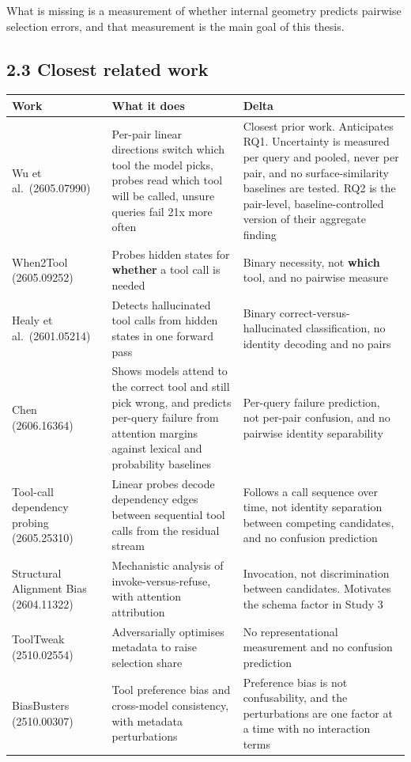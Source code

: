 \documentclass[11pt,a4paper]{article}
\begin{document}
What is missing is a measurement of whether internal geometry predicts pairwise selection errors,
and that measurement is the main goal of this thesis.

\subsection*{2.3 Closest related work}

\begin{tabular}{@{}L{3.2cm}L{5.9cm}L{6.2cm}@{}}
\toprule
\textbf{Work} & \textbf{What it does} & \textbf{Delta} \\
\midrule
Wu et al.\ (2605.07990) & Per-pair linear directions switch which tool the model picks, probes read which tool will be called, unsure queries fail 21x more often & Closest prior work. Anticipates RQ1. Uncertainty is measured per query and pooled, never per pair, and no surface-similarity baselines are tested. RQ2 is the pair-level, baseline-controlled version of their aggregate finding \\
When2Tool (2605.09252) & Probes hidden states for \textbf{whether} a tool call is needed & Binary necessity, not \textbf{which} tool, and no pairwise measure \\
Healy et al.\ (2601.05214) & Detects hallucinated tool calls from hidden states in one forward pass & Binary correct-versus-hallucinated classification, no identity decoding and no pairs \\
Chen (2606.16364) & Shows models attend to the correct tool and still pick wrong, and predicts per-query failure from attention margins against lexical and probability baselines & Per-query failure prediction, not per-pair confusion, and no pairwise identity separability \\
Tool-call dependency probing (2605.25310) & Linear probes decode dependency edges between sequential tool calls from the residual stream & Follows a call sequence over time, not identity separation between competing candidates, and no confusion prediction \\
Structural Alignment Bias (2604.11322) & Mechanistic analysis of invoke-versus-refuse, with attention attribution & Invocation, not discrimination between candidates. Motivates the schema factor in Study 3 \\
ToolTweak (2510.02554) & Adversarially optimises metadata to raise selection share & No representational measurement and no confusion prediction \\
BiasBusters (2510.00307) & Tool preference bias and cross-model consistency, with metadata perturbations & Preference bias is not confusability, and the perturbations are one factor at a time with no interaction terms \\

\end{tabular}
\end{document}
